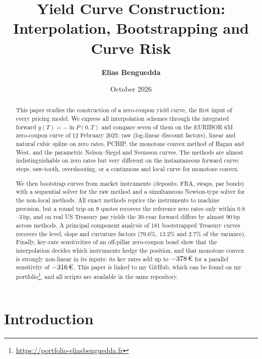 \documentclass[11pt,a4paper]{article}
\title{\textbf{Yield Curve Construction:\\
Interpolation, Bootstrapping and Curve Risk}}
\author{\textbf{Elias Benguedda}}
\date{October 2026}
\theoremstyle{plain}
\theoremstyle{definition}
\newcommand{\bp}{\,\mathrm{bp}}
\newcommand{\eur}{\text{\texteuro}}
\begin{document}
\maketitle

\begin{abstract}
This paper studies the construction of a zero-coupon yield curve, the first input of every pricing model. We express all interpolation schemes through the integrated forward $y(T)=-\ln P(0,T)$ and compare seven of them on the EURIBOR 6M zero-coupon curve of 12 February 2025: raw (log-linear discount factors), linear and natural cubic spline on zero rates, PCHIP, the monotone convex method of Hagan and West, and the parametric Nelson--Siegel and Svensson curves. The methods are almost indistinguishable on zero rates but very different on the instantaneous forward curve: steps, saw-tooth, overshooting, or a continuous and local curve for monotone convex.

We then bootstrap curves from market instruments (deposits, FRA, swaps, par bonds) with a sequential solver for the raw method and a simultaneous Newton-type solver for the non-local methods. All exact methods reprice the instruments to machine precision, but a round trip on 9 quotes recovers the reference zero rates only within $0.8$--$3\bp$, and on real US Treasury par yields the 30-year forward differs by almost $90\bp$ across methods. A principal component analysis of 181 bootstrapped Treasury curves recovers the level, slope and curvature factors ($79.6\%$, $13.2\%$ and $2.7\%$ of the variance). Finally, key-rate sensitivities of an off-pillar zero-coupon bond show that the interpolation decides which instruments hedge the position, and that monotone convex is strongly non-linear in its inputs: its key rates add up to $-378\,\eur$ for a parallel sensitivity of $-316\,\eur$. This paper is linked to my GitHub, which can be found on my portfolio\footnote{\url{https://portfolio-eliasbenguedda.fr}}, and all scripts are available in the same repository.
\end{abstract}

\clearpage

\tableofcontents
\newpage

\section{Introduction}
\label{sec:intro}
\end{document}
